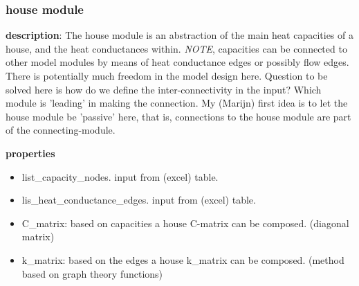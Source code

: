 %
%
%

\subsubsection{house module}
\textbf{description}: The house module is an abstraction of the main heat capacities of a house, and the heat conductances within. \emph{NOTE}, capacities can be connected to other model modules by means of heat conductance edges or possibly flow edges. There is potentially much freedom in the model design here. Question to be solved here is how do we define the inter-connectivity in the input? Which module is 'leading' in making the connection. My (Marijn) first idea is to let the house module be 'passive' here, that is, connections to the house module are part of the connecting-module.    

\textbf{properties}
\begin{itemize}
	\item list\_capacity\_nodes. input from (excel) table.
	\item lis\_heat\_conductance\_edges. input from (excel) table.
	\item C\_matrix: based on capacities a house C-matrix can be composed. (diagonal matrix)
	\item k\_matrix: based on the edges a house k\_matrix can be composed. (method based on graph theory functions)
\end{itemize}


